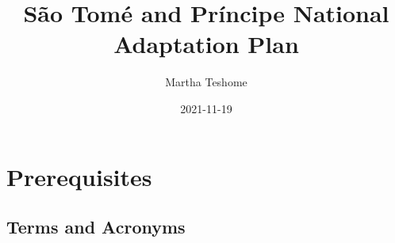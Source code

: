 \documentclass[
]{book}
\title{São Tomé and Príncipe National Adaptation Plan}
\author{Martha Teshome}
\date{2021-11-19}
\begin{document}
\maketitle

{
\setcounter{tocdepth}{1}
\tableofcontents
}
\hypertarget{prerequisites}{%
\chapter*{Prerequisites}\label{prerequisites}}

\hypertarget{terms-and-acronyms}{%
\section*{Terms and Acronyms}\label{terms-and-acronyms}}

\providecommand{\docline}[3]{\noalign{\global\setlength{\arrayrulewidth}{#1}}\arrayrulecolor[HTML]{#2}\cline{#3}}

\setlength{\tabcolsep}{2pt}

\renewcommand*{\arraystretch}{1.5}
\end{document}
